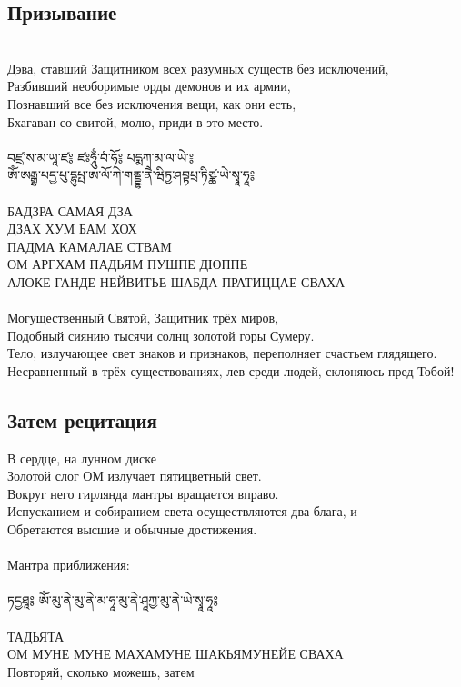 \subsection{Призывание}
\\
Дэва, ставший Защитником всех разумных существ без исключений,\\
Разбивший необоримые орды демонов и их армии,\\
Познавший все без исключения вещи, как они есть,\\
Бхагаван со свитой, молю, приди в это место.\\
\\
\ti
བཛྲ་ས་མ་ཡཱ་ཛ༔ ཛཿཧཱུྃ་བཾ་ཧོ༔ པདྨཀ་མ་ལ་ཡེ་༔ \\
ཨོཾ་ཨརྒྷ་པདྱ་པུ་དྷུཔྤ་ཨ་ལོ་ཀེ་གནྡྷ་ནཻ་ཝིཏྱ་ཤབྟཔྲ་ཏིཙྪ་ཡེ་སྭཱ་ཧཱ༔\\
\\
\ru
БАДЗРА САМАЯ ДЗА\\
ДЗАХ ХУМ БАМ ХОХ\\
ПАДМА КАМАЛАЕ СТВАМ\\
ОМ АРГХАМ ПАДЬЯМ ПУШПЕ ДЮППЕ\\
АЛОКЕ ГАНДЕ НЕЙВИТЬЕ ШАБДА ПРАТИЦЦАЕ СВАХА\\
\\
Могущественный Святой, Защитник трёх миров,\\
Подобный сиянию тысячи солнц золотой горы Сумеру.\\
Тело, излучающее свет знаков и признаков, переполняет счастьем глядящего.\\
Несравненный в трёх существованиях, лев среди людей, склоняюсь пред Тобой!
\subsection*{Затем рецитация}
В сердце, на лунном диске\\
Золотой слог ОМ излучает пятицветный свет.\\
Вокруг него гирлянда мантры вращается вправо.\\
Испусканием  и собиранием света осуществляются два блага, и\\
Обретаются высшие и обычные достижения.\\
\\
Мантра приближения:\\
\\
\ti ཏདྱཐཱ༔ ཨོཾ་མུ་ནེ་མུ་ནེ་མ་ཧཱ་མུ་ནེ་ཤཱཀྱ་མུ་ནེ་ཡེ་སྭཱ་ཧཱ༔\\
\\
\noindent \ru ТАДЬЯТА \\ ОМ МУНЕ МУНЕ МАХАМУНЕ ШАКЬЯМУНЕЙЕ СВАХА\\
\scriptsize Повторяй, сколько можешь, затем \normalsize

